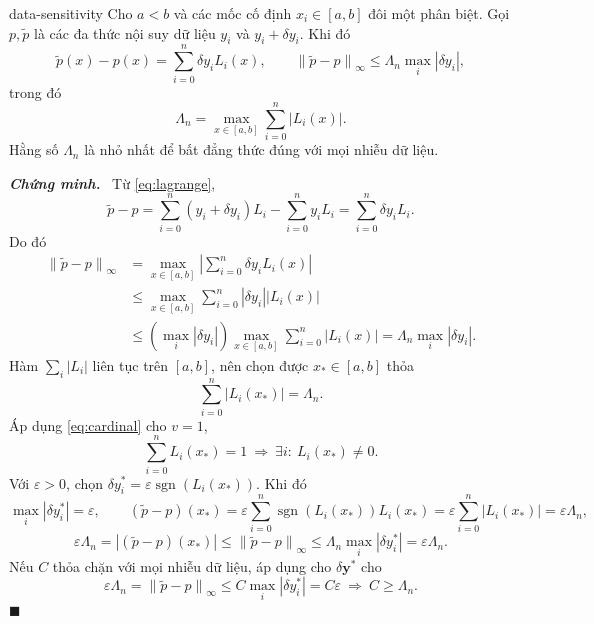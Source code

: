 \documentclass[12pt,a4paper,oneside]{book}
\numberwithin{algorithm}{chapter}
\theoremstyle{definition}
\newenvironment{chungminh}{\par\medskip\noindent\textbf{\textit{\color{mainblue}Chứng minh.}}\ }{\hfill$\blacksquare$\par\medskip}
\newcommand{\norminf}[1]{\left\lVert #1\right\rVert_{\infty}}
\begin{document}
\begin{menhde}{}{data-sensitivity}
Cho $a<b$ và các mốc cố định $x_i\in[a,b]$ đôi một phân biệt. Gọi $p,\widetilde p$ là các đa thức nội suy dữ liệu $y_i$ và $y_i+\delta y_i$. Khi đó
\[
 \widetilde p(x)-p(x)=\sum_{i=0}^n\delta y_iL_i(x),\qquad
 \norminf{\widetilde p-p}\leq\Lambda_n\max_i|\delta y_i|,
\]
trong đó
\[
 \Lambda_n=\max_{x\in[a,b]}\sum_{i=0}^n|L_i(x)|.
\]
Hằng số $\Lambda_n$ là nhỏ nhất để bất đẳng thức đúng với mọi nhiễu dữ liệu.
\end{menhde}
\begin{chungminh}
Từ \eqref{eq:lagrange},
\[
 \widetilde p-p
 =\sum_{i=0}^n(y_i+\delta y_i)L_i-\sum_{i=0}^ny_iL_i
 =\sum_{i=0}^n\delta y_iL_i.
\]
Do đó
\begin{align*}
 \norminf{\widetilde p-p}
 &=\max_{x\in[a,b]}\left|\sum_{i=0}^n\delta y_iL_i(x)\right|\\
 &\leq\max_{x\in[a,b]}\sum_{i=0}^n|\delta y_i||L_i(x)|\\
 &\leq\left(\max_i|\delta y_i|\right)
       \max_{x\in[a,b]}\sum_{i=0}^n|L_i(x)|
 =\Lambda_n\max_i|\delta y_i|.
\end{align*}
Hàm $\sum_i|L_i|$ liên tục trên $[a,b]$, nên chọn được $x_*\in[a,b]$ thỏa
\[
 \sum_{i=0}^n|L_i(x_*)|=\Lambda_n.
\]
Áp dụng \eqref{eq:cardinal} cho $v=1$,
\[
 \sum_{i=0}^nL_i(x_*)=1
 \ \Longrightarrow\ \exists i:\ L_i(x_*)\ne0.
\]
Với $\varepsilon>0$, chọn $\delta y_i^*=\varepsilon\operatorname{sgn}(L_i(x_*))$. Khi đó
\[
 \max_i|\delta y_i^*|=\varepsilon,\qquad
 (\widetilde p-p)(x_*)
 =\varepsilon\sum_{i=0}^n\operatorname{sgn}(L_i(x_*))L_i(x_*)
 =\varepsilon\sum_{i=0}^n|L_i(x_*)|=\varepsilon\Lambda_n,
\]
\[
 \varepsilon\Lambda_n
 =|(\widetilde p-p)(x_*)|
 \leq\norminf{\widetilde p-p}
 \leq\Lambda_n\max_i|\delta y_i^*|=\varepsilon\Lambda_n.
\]
Nếu $C$ thỏa chặn với mọi nhiễu dữ liệu, áp dụng cho $\delta\mathbf y^*$ cho
\[
 \varepsilon\Lambda_n=\norminf{\widetilde p-p}
 \leq C\max_i|\delta y_i^*|=C\varepsilon
 \ \Longrightarrow\ C\geq\Lambda_n.
\]
\end{chungminh}
\end{document}
